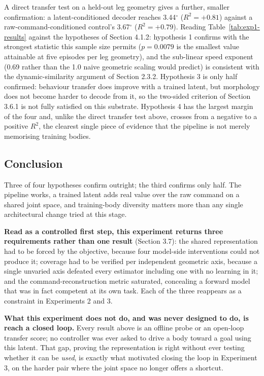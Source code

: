 \documentclass[12pt,a4paper,oneside]{report}
\begin{document}
A direct transfer test on a held-out leg geometry gives a further, smaller confirmation: a latent-conditioned
decoder reaches 3.44$^\circ$ ($R^2=+0.81$) against a raw-command-conditioned control's 3.67$^\circ$ ($R^2=+0.79$).
Reading Table~\ref{tab:exp1-results} against the hypotheses of Section 4.1.2: hypothesis 1 confirms with the
strongest statistic this sample size permits ($p=0.0079$ is the smallest value attainable at five episodes per
leg geometry), and the sub-linear speed exponent (0.69 rather than the 1.0 naive geometric scaling would predict)
is consistent with the dynamic-similarity argument of Section 2.3.2. Hypothesis 3 is only half confirmed:
behaviour transfer does improve with a trained latent, but morphology does not become harder to decode from it,
so the two-sided criterion of Section 3.6.1 is not fully satisfied on this substrate. Hypothesis 4 has the
largest margin of the four and, unlike the direct transfer test above, crosses from a negative to a positive
$R^2$, the clearest single piece of evidence that the pipeline is not merely memorising training bodies.

\subsection{Conclusion}
Three of four hypotheses confirm outright; the third confirms only half. The pipeline works, a trained latent
adds real value over the raw command on a shared joint space, and training-body diversity matters more than any
single architectural change tried at this stage.

\noindent\textbf{Read as a controlled first step, this experiment returns three requirements rather than one
result} (Section 3.7): the shared representation had to be forced by the objective, because four model-side
interventions could not produce it; coverage had to be verified per independent geometric axis, because a single
unvaried axis defeated every estimator including one with no learning in it; and the command-reconstruction metric
saturated, concealing a forward model that was in fact competent at its own task. Each of the three reappears as a
constraint in Experiments 2 and 3.

\noindent\textbf{What this experiment does not do, and was never designed to do, is reach a closed loop.} Every
result above is an offline probe or an open-loop transfer score; no controller was ever asked to drive a body
toward a goal using this latent. That gap, proving the representation is right without ever testing whether it can
be \emph{used}, is exactly what motivated closing the loop in Experiment 3, on the harder pair where the joint
space no longer offers a shortcut.
\end{document}
